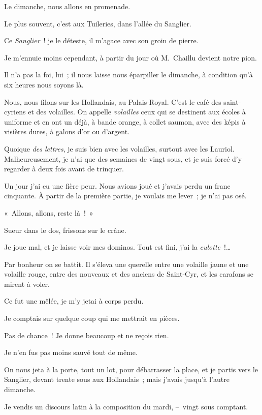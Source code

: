 \documentclass[french,twoside]{book} %
\begin{document}
\bigbreak
\noindent Le dimanche, nous allons en promenade.\par
Le plus souvent, c’est aux Tuileries, dans l’allée du Sanglier.\par
Ce \emph{Sanglier} ! je le déteste, il m’agace avec son groin de pierre.\par
\bigbreak
\noindent Je m’ennuie moins cependant, à partir du jour où M. Chaillu devient notre pion.\par
Il n’a pas la foi, lui ; il nous laisse nous éparpiller le dimanche, à condition qu’à six heures nous soyons là.\par
Nous, nous filons sur les Hollandais, au Palais-Royal. C’est le café des saint-cyriens et des volailles. On appelle \emph{volailles} ceux qui se destinent aux écoles à uniforme et en ont un déjà, à bande orange, à collet saumon, avec des képis à visières dures, à galons d’or ou d’argent.\par
Quoique \emph{des lettres}, je suis bien avec les volailles, surtout avec les Lauriol. Malheureusement, je n’ai que des semaines de vingt sous, et je suis forcé d’y regarder à deux fois avant de trinquer.\par
Un jour j’ai eu une fière peur. Nous avions joué et j’avais perdu un franc cinquante. À partir de la première partie, je voulais me lever ; je n’ai pas osé.\par
« Allons, allons, reste là ! »\par
Sueur dans le dos, frissons sur le crâne.\par
Je joue mal, et je laisse voir mes dominos. Tout est fini, j’ai la \emph{culotte} !…\par
Par bonheur on se battit. Il s’éleva une querelle entre une volaille jaune et une volaille rouge, entre des nouveaux et des anciens de Saint-Cyr, et les carafons se mirent à voler.\par
Ce fut une mêlée, je m’y jetai à corps perdu.\par
Je comptais sur quelque coup qui me mettrait en pièces.\par
Pas de chance ! Je donne beaucoup et ne reçois rien.\par
Je n’en fus pas moins sauvé tout de même.\par
On nous jeta à la porte, tout un lot, pour débarrasser la place, et je partis vers le Sanglier, devant trente sous aux Hollandais ; mais j’avais jusqu’à l’autre dimanche.\par
Je vendis un discours latin à la composition du mardi, – vingt sous comptant.\par
\end{document}
